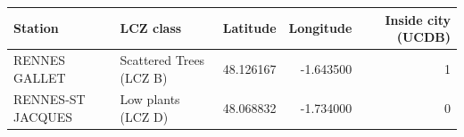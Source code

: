 \begin{tabular}{llrrr}
\toprule
Station & LCZ class & Latitude & Longitude & Inside city (UCDB) \\
\midrule
RENNES GALLET & Scattered Trees (LCZ B) & 48.126167 & -1.643500 & 1 \\
RENNES-ST JACQUES & Low plants (LCZ D) & 48.068832 & -1.734000 & 0 \\
\bottomrule
\end{tabular}

